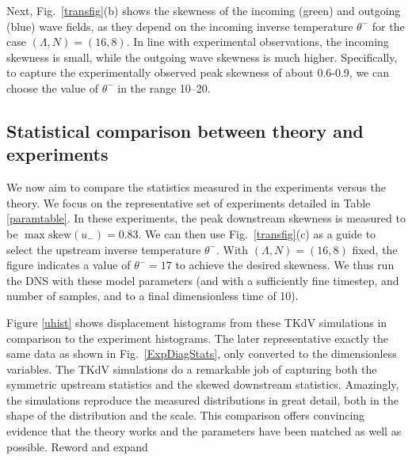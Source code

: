 \documentclass[11pt]{article}
\newcommand{\nick}[1]{{\color{red} #1}}
\newcommand{\lamfac}{N}
\newcommand{\skw}{\text{skew}}
\newcommand{\uup}{u_{-}}
\newcommand{\thup}{\theta^{-}}
\begin{document}
	Next, Fig.~\ref{transfig}(b) shows the skewness of the incoming (green) and outgoing (blue) wave fields, as they depend on the incoming inverse temperature $\thup$ for the case $(\Lambda, \lamfac) = (16, 8)$. In line with experimental observations, the incoming skewness is small, while the outgoing wave skewness is much higher. Specifically, to capture the experimentally observed peak skewness of about 0.6-0.9, we can choose the value of $\thup$ in the range 10--20.

\subsection{Statistical comparison between theory and experiments}

	We now aim to compare the statistics measured in the experiments versus the theory. We focus on the representative set of experiments detailed in Table \ref{paramtable}. In these experiments, the peak downstream skewness is measured to be $\max \skw(\uup) = 0.83$. We can then use Fig.~\ref{transfig}(c) as a guide to select the upstream inverse temperature $\thup$. With $(\Lambda, \lamfac) = (16, 8)$ fixed, the figure indicates a value of $\thup = 17$ to achieve the desired skewness. We thus run the DNS with these model parameters (and with a sufficiently fine timestep, and number of samples, and to a final dimensionless time of 10).
	
	Figure \ref{uhist} shows displacement histograms from these TKdV simulations in comparison to the experiment histograms. The later representative exactly the same data as shown in Fig.~\ref{ExpDiagStats}, only converted to the dimensionless variables. The TKdV simulations do a remarkable job of capturing both the symmetric upstream statistics and the skewed downstream statistics. Amazingly, the simulations reproduce the measured distributions in great detail, both in the shape of the distribution and the scale.
%
This comparison offers convincing evidence that the theory works and the parameters have been matched as well as possible. \nick{Reword and expand}
\end{document}
